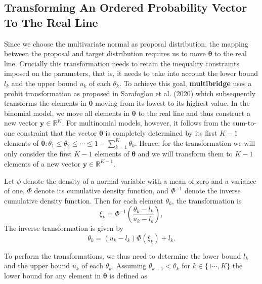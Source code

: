 \clearpage
\makeatletter
\efloat@restorefloats
\makeatother


\begin{appendix}
\hypertarget{transforming-an-ordered-probability-vector-to-the-real-line}{%
\section{Transforming An Ordered Probability Vector To The Real
Line}\label{transforming-an-ordered-probability-vector-to-the-real-line}}

Since we choose the multivariate normal as proposal distribution, the
mapping between the proposal and target distribution requires us to move
\(\boldsymbol{\theta}\) to the real line. Crucially this transformation
needs to retain the inequality constraints imposed on the parameters,
that is, it needs to take into account the lower bound \(l_k\) and the
upper bound \(u_k\) of each \(\theta_k\). To achieve this goal,
\textbf{multibridge} uses a probit transformation as proposed in
Sarafoglou et al. (2020) which subsequently transforms the elements in
\(\boldsymbol{\theta}\) moving from its lowest to its highest value. In
the binomial model, we move all elements in \(\boldsymbol{\theta}\) to
the real line and thus construct a new vector
\(\boldsymbol{y} \in \mathbb{R}^{K}\). For multinomial models, however,
it follows from the sum-to-one constraint that the vector
\(\boldsymbol{\theta}\) is completely determined by its first \(K - 1\)
elements of
\(\boldsymbol{\theta}: \theta_1 \leq \theta_2 \leq \cdots \leq 1 - \sum_{k = 1}^K \theta_k\).
Hence, for the transformation we will only consider the first \(K - 1\)
elements of \(\boldsymbol{\theta}\) and we will transform them to
\(K - 1\) elements of a new vector
\(\boldsymbol{y} \in \mathbb{R}^{K - 1}\).

Let \(\phi\) denote the density of a normal variable with a mean of zero
and a variance of one, \(\Phi\) denote its cumulative density function,
and \(\Phi^{-1}\) denote the inverse cumulative density function. Then
for each element \(\theta_k\), the transformation is
\[\xi_k = \Phi^{-1}\left(\frac{\theta_k - l_k}{u_k - l_k}\right),\] The
inverse transformation is given by
\[\theta_k = (u_k - l_k) \Phi(\xi_k) + l_k.\]

To perform the transformations, we thus need to determine the lower
bound \(l_k\) and the upper bound \(u_k\) of each \(\theta_k\). Assuming
\(\theta_{k-1} < \theta_{k}\) for \(k \in \{1 \cdots, K\}\) the lower
bound for any element in \(\boldsymbol{\theta}\) is defined as


\end{appendix}
